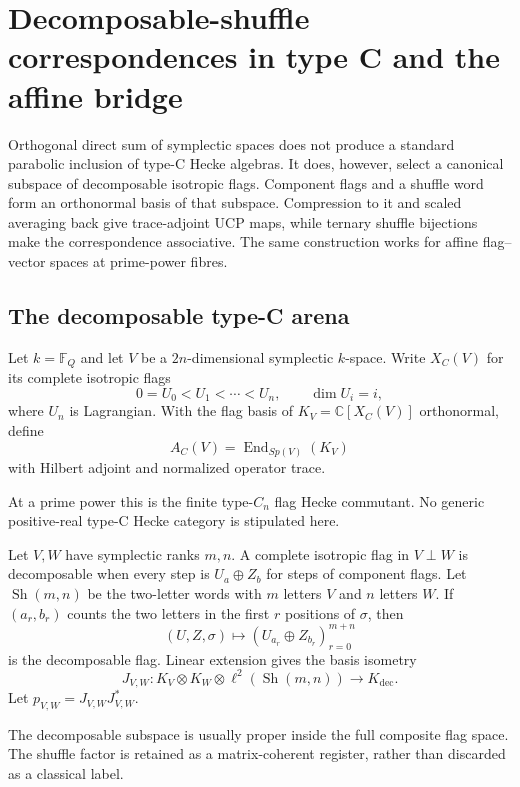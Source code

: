 \clearpage
\section{Decomposable-shuffle correspondences in type C and the affine bridge}
\label{sec:f1-limit-type-c}

Orthogonal direct sum of symplectic spaces does not produce a standard
parabolic inclusion of type-C Hecke algebras.  It does, however, select a
canonical subspace of decomposable isotropic flags.  Component flags and a
shuffle word form an orthonormal basis of that subspace.  Compression to it
and scaled averaging back give trace-adjoint UCP maps, while ternary shuffle
bijections make the correspondence associative.  The same construction
works for affine flag--vector spaces at prime-power fibres.

\subsection{The decomposable type-C arena}

\begin{definition}
Let $k=\mathbb F_Q$ and let $V$ be a $2n$-dimensional symplectic $k$-space.
Write $X_C(V)$ for its complete isotropic flags
\[
 0=U_0<U_1<\cdots<U_n,\qquad \dim U_i=i,
\]
where $U_n$ is Lagrangian.  With the flag basis of
$K_V=\mathbb C[X_C(V)]$ orthonormal, define
\[
 A_C(V)=\operatorname{End}_{Sp(V)}(K_V)
\]
with Hilbert adjoint and normalized operator trace.
\end{definition}
\begin{scope}
At a prime power this is the finite type-$C_n$ flag Hecke commutant.  No
generic positive-real type-C Hecke category is stipulated here.
\end{scope}

\begin{definition}
Let $V,W$ have symplectic ranks $m,n$.  A complete isotropic flag in
$V\perp W$ is decomposable when every step is $U_a\oplus Z_b$ for steps of
component flags.  Let $\operatorname{Sh}(m,n)$ be the two-letter words with
$m$ letters $V$ and $n$ letters $W$.  If $(a_r,b_r)$ counts the two letters
in the first $r$ positions of $\sigma$, then
\[
 (U,Z,\sigma)\longmapsto
       (U_{a_r}\oplus Z_{b_r})_{r=0}^{m+n}
\]
is the decomposable flag.  Linear extension gives the basis isometry
\[
 J_{V,W}:K_V\otimes K_W\otimes
       \ell^2(\operatorname{Sh}(m,n))\longrightarrow K_{\mathrm{dec}}.
\]
Let $p_{V,W}=J_{V,W}J_{V,W}^*$.
\end{definition}
\begin{scope}
The decomposable subspace is usually proper inside the full composite flag
space.  The shuffle factor is retained as a matrix-coherent register, rather
than discarded as a classical label.
\end{scope}

